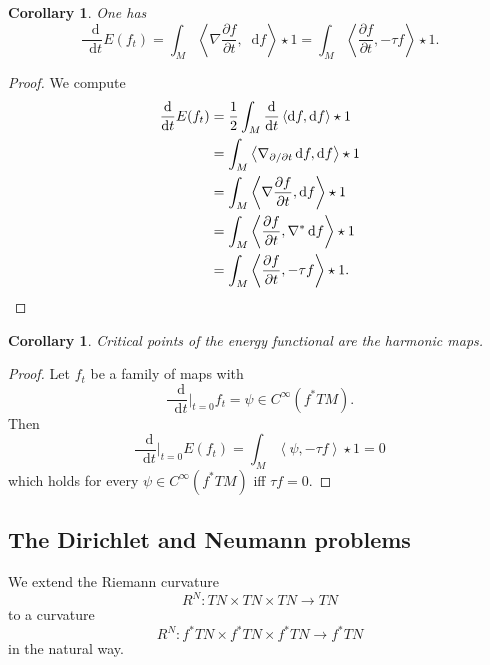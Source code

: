 \documentclass[reqno,12pt,letterpaper]{amsart}
\newcommand*\dif{\mathop{}\!\mathrm{d}}
\newcommand{\bral}{\left\langle}
\newcommand{\brar}{\right\rangle}
\newtheorem{corollary}[theorem]{Corollary}
\theoremstyle{definition}
\numberwithin{equation}{section}
\begin{document}
\begin{corollary}
One has 
$$\frac{\dif}{\dif t} E(f_t) = \int_M \bral \nabla \frac{\partial f}{\partial t}, \dif f\brar \star 1 = \int_M \bral \frac{\partial f}{\partial t}, -\tau f\brar \star 1.$$
\end{corollary}
\begin{proof}
We compute 
\begin{align*}
\frac{\dif}{\dif t} E(f_t) &= \frac{1}{2} \int_M \frac{\dif}{\dif t} \bral \dif f, \dif f \brar \star 1\\
&= \int_M \bral \nabla_{\partial/\partial t} \dif f, \dif f \brar \star 1\\
&= \int_M \bral \nabla \frac{\partial f}{\partial t}, \dif f \brar \star 1\\
&= \int_M \bral \frac{\partial f}{\partial t}, \nabla^* \dif f \brar \star 1\\
&= \int_M \bral \frac{\partial f}{\partial t}, -\tau f \brar \star 1. \qedhere
\end{align*}
\end{proof}

\begin{corollary}
Critical points of the energy functional are the harmonic maps.
\end{corollary}
\begin{proof}
Let $f_t$ be a family of maps with 
$$\frac{\dif}{\dif t}\bigg|_{t = 0} f_t = \psi \in C^\infty(f^* TM).$$
Then 
$$\frac{\dif}{\dif t}\bigg|_{t = 0} E(f_t) = \int_M \bral \psi, -\tau f \brar \star 1 = 0$$
which holds for every $\psi \in C^\infty(f^* TM)$ iff $\tau f = 0$.
\end{proof}

\subsection{The Dirichlet and Neumann problems}
We extend the Riemann curvature 
$$R^N: TN \times TN \times TN \to TN$$
to a curvature
$$R^N: f^* TN \times f^* TN \times f^* TN \to f^* TN$$
in the natural way.
\end{document}
